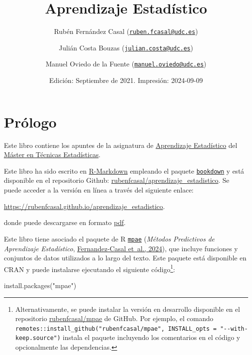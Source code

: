 \documentclass[
]{book}
\title{Aprendizaje Estadístico}
\author{Rubén Fernández Casal (\href{mailto:ruben.fcasal@udc.es}{\nolinkurl{ruben.fcasal@udc.es}}) \and Julián Costa Bouzas (\href{mailto:julian.costa@udc.es}{\nolinkurl{julian.costa@udc.es}}) \and Manuel Oviedo de la Fuente (\href{mailto:manuel.oviedo@udc.es}{\nolinkurl{manuel.oviedo@udc.es}})}
\date{Edición: Septiembre de 2021. Impresión: 2024-09-09}
\newenvironment{Shaded}{\begin{snugshade}}{\end{snugshade}}
\newcommand{\FunctionTok}[1]{\textcolor[rgb]{0.00,0.00,0.00}{#1}}
\newcommand{\NormalTok}[1]{#1}
\newcommand{\StringTok}[1]{\textcolor[rgb]{0.31,0.60,0.02}{#1}}
\theoremstyle{break}
\theoremstyle{nonumberplain}
\begin{document}
\maketitle

{
\setcounter{tocdepth}{1}
\tableofcontents
}
\hypertarget{pruxf3logo}{%
\chapter*{Prólogo}\label{pruxf3logo}}

Este libro contiene los apuntes de la asignatura de \href{http://eamo.usc.es/pub/mte/index.php?option=com_content\&view=article\&id=74}{Aprendizaje Estadístico} del \href{http://eio.usc.es/pub/mte}{Máster en Técnicas Estadísticas}.

Este libro ha sido escrito en \href{http://rmarkdown.rstudio.com}{R-Markdown} empleando el paquete \href{https://bookdown.org/yihui/bookdown/}{\texttt{bookdown}} y está disponible en el repositorio Github: \href{https://github.com/rubenfcasal/aprendizaje_estadistico}{rubenfcasal/aprendizaje\_estadistico}.
Se puede acceder a la versión en línea a través del siguiente enlace:

\url{https://rubenfcasal.github.io/aprendizaje_estadistico}.

donde puede descargarse en formato \href{https://rubenfcasal.github.io/aprendizaje_estadistico/aprendizaje_estadistico.pdf}{pdf}.

Este libro tiene asociado el paquete de R \href{https://rubenfcasal.github.io/mpae}{\texttt{mpae}} (\emph{Métodos Predictivos de Aprendizaje Estadístico}, \protect\hyperlink{ref-R-mpae}{Fernandez-Casal et~al., 2024}), que incluye funciones y conjuntos de datos utilizados a lo largo del texto.
Este paquete está disponible en CRAN y puede instalarse ejecutando el siguiente código\footnote{Alternativamente, se puede instalar la versión en desarrollo disponible en el repositorio \href{https://github.com/rubenfcasal/mpae}{rubenfcasal/mpae} de GitHub.
  Por ejemplo, el comando \texttt{remotes::install\_github("rubenfcasal/mpae",\ INSTALL\_opts\ =\ "-\/-with-keep.source")} instala el paquete incluyendo los comentarios en el código y opcionalmente las dependencias.}:

\begin{Shaded}
\begin{Highlighting}[]
\FunctionTok{install.packages}\NormalTok{(}\StringTok{"mpae"}\NormalTok{)}
\end{Highlighting}
\end{Shaded}
\end{document}

